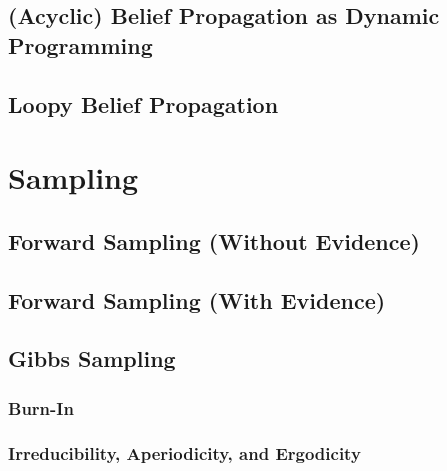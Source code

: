         \subsection{(Acyclic) Belief Propagation as Dynamic Programming} %

        \subsection{Loopy Belief Propagation} %

    \section{Sampling} %

        \subsection{Forward Sampling (Without Evidence)} %

        \subsection{Forward Sampling (With Evidence)} %

        \subsection{Gibbs Sampling} %

            \subsubsection{Burn-In} %

            \subsubsection{Irreducibility, Aperiodicity, and Ergodicity} %


